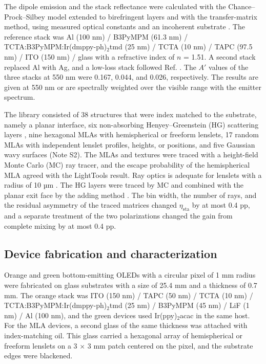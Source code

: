 \documentclass{optica-article}
\begin{document}
The dipole emission and the stack reflectance were calculated with the Chance–Prock–Silbey model extended to birefringent layers and with the transfer-matrix method, using measured optical constants and an incoherent substrate \cite{r26,r27,r28}. The reference stack was Al (100 nm) / B3PyMPM (61.3 nm) / TCTA:B3PyMPM:Ir(dmppy-ph)$_2$tmd (25 nm) / TCTA (10 nm) / TAPC (97.5 nm) / ITO (150 nm) / glass with a refractive index of $n$ = 1.51. A second stack replaced Al with Ag, and a low-loss stack followed Ref. \cite{r13}. The $A'$ values of the three stacks at 550 nm were 0.167, 0.044, and 0.026, respectively. The results are given at 550 nm or are spectrally weighted over the visible range with the emitter spectrum.

The library consisted of 38 structures that were index matched to the substrate, namely a planar interface, six non-absorbing Henyey–Greenstein (HG) scattering layers \cite{r29}, nine hexagonal MLAs with hemispherical or freeform lenslets, 17 random MLAs with independent lenslet profiles, heights, or positions, and five Gaussian wavy surfaces (Note S2). The MLAs and textures were traced with a height-field Monte Carlo (MC) ray tracer, and the escape probability of the hemispherical MLA agreed with the LightTools result. Ray optics is adequate for lenslets with a radius of 10 µm \cite{r30}. The HG layers were traced by MC and combined with the planar exit face by the adding method \cite{r31}. The bin width, the number of rays, and the residual asymmetry of the traced matrices changed $\eta_{\mathrm{sta}}$ by at most 0.4 pp, and a separate treatment of the two polarizations changed the gain from complete mixing by at most 0.4 pp.

\subsection{Device fabrication and characterization}

Orange and green bottom-emitting OLEDs with a circular pixel of 1 mm radius were fabricated on glass substrates with a size of 25.4 mm and a thickness of 0.7 mm. The orange stack was ITO (150 nm) / TAPC (50 nm) / TCTA (10 nm) / TCTA:B3PyMPM:Ir(dmppy-ph)$_2$tmd (25 nm) / B3PyMPM (45 nm) / LiF (1 nm) / Al (100 nm), and the green devices used Ir(ppy)$_2$acac in the same host. For the MLA devices, a second glass of the same thickness was attached with index-matching oil. This glass carried a hexagonal array of hemispherical or freeform lenslets on a 3 \ensuremath{\times} 3 mm patch centered on the pixel, and the substrate edges were blackened.
\end{document}
